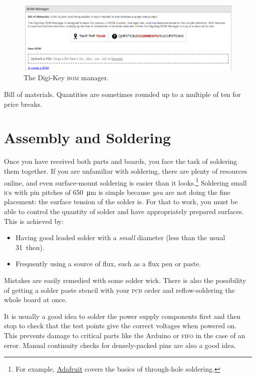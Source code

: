\documentclass[12pt]{article}
\begin{document}
\begin{figure}[hb]
  \centering
  \includegraphics[width=\linewidth]{digikey-bom}
  \caption{The Digi-Key \textsc{bom} manager.}\label{fig:digikey-bom}
\end{figure}

\begin{landscape}
\begin{table}[ht]
\caption{Bill of materials. Quantities are sometimes rounded up to a multiple of
ten for price breaks.}\label{tab:bom}
\scriptsize

\end{table}
\end{landscape}
\restoregeometry%

\section{Assembly and Soldering}

Once you have received both parts and boards, you face the task of soldering
them together. If you are unfamiliar with soldering, there are plenty of
resources online, and even surface-mount soldering is easier than it
looks.\footnote{For example,
  \href{https://learn.adafruit.com/adafruit-guide-excellent-soldering/tools}{Adafruit}
covers the basics of through-hole soldering.}
Soldering small \textsc{ic}s with pin pitches of \SI{650}{\um} is simple because
\emph{you} are not doing the fine placement: the surface tension of the solder
is. For that to work, you must be able to control the quantity of solder and
have appropriately prepared surfaces. This is achieved by:
\begin{itemize}
  \item Having good leaded solder with a \emph{small} diameter (less than the
    usual \SI{31}{thou}).
  \item Frequently using a source of flux, such as a flux pen or paste.
\end{itemize}
Mistakes are easily remedied with some solder wick. There is also the
possibility of getting a solder paste stencil with your \textsc{pcb} order and
reflow-soldering the whole board at once.

It is usually a good idea to solder the power supply components first and then
stop to check that the test points give the correct voltages when powered on.
This prevents damage to critical parts like the Arduino or \textsc{fifo} in the
case of an error. Manual continuity checks for densely-packed pins are also a
good idea.


\end{document}
